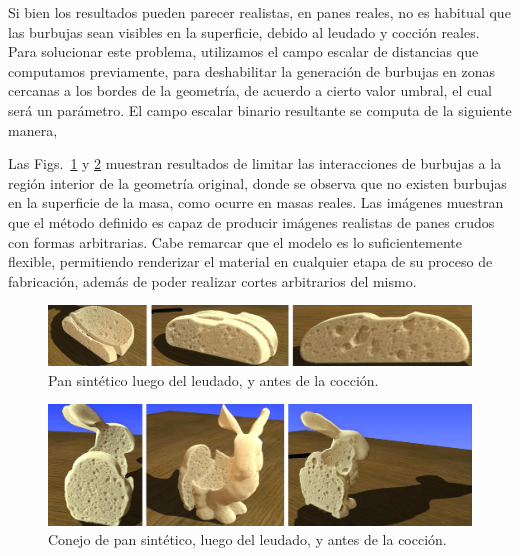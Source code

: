 Si bien los resultados pueden parecer realistas, en panes reales, no es habitual que las burbujas sean visibles en la superficie, debido al leudado y cocción reales.
Para solucionar este problema, utilizamos el campo escalar de distancias que computamos previamente, para deshabilitar la generación de burbujas en zonas cercanas a los bordes de la geometría, de acuerdo a cierto valor umbral, el cual será un parámetro.
El campo escalar binario resultante se computa de la siguiente manera,

%
Las Figs.~\ref{fg:proving} y \ref{fg:provingBunny} muestran resultados de limitar las interacciones de burbujas a la región interior de la geometría original, donde se observa que no existen burbujas en la superficie de la masa, como ocurre en masas reales.
Las imágenes muestran que el método definido es capaz de producir imágenes realistas de panes crudos con formas arbitrarias.
Cabe remarcar que el modelo es lo suficientemente flexible, permitiendo renderizar el material en cualquier etapa de su proceso de fabricación, además de poder realizar cortes arbitrarios del mismo.

\begin{figure}
\includegraphics[width=13cm]{figures/prebakebread}
\caption{Pan sintético luego del leudado, y antes de la cocción.}
\label{fg:proving}
\end{figure}

\begin{figure}
\includegraphics[width=13cm]{figures/prebakebunny}
\caption{Conejo de pan sintético, luego del leudado, y antes de la cocción.}
\label{fg:provingBunny}
\end{figure}

